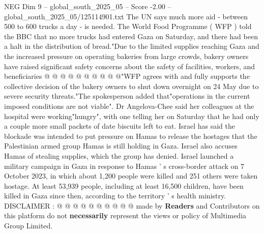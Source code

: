 \begin{textsample}{NEG Dim 9 – global\_south\_2025\_05 – Score -2.00 – global\_south\_2025\_05/125114901.txt}
The UN says much more aid - between 500 to 600 trucks a day - is needed.
The World Food Programme ( WFP ) told the BBC that no more trucks had entered Gaza on Saturday, and there had been a halt in the distribution of bread."Due to the limited supplies reaching Gaza and the increased pressure on operating bakeries from large crowds, bakery owners have raised significant safety concerns about the safety of facilities, workers, and beneficiaries @ @ @ @ @ @ @ @ @ @"WFP agrees with and fully supports the collective decision of the bakery owners to shut down overnight on 24 May due to severe security threats."The spokesperson added that"operations in the current imposed conditions are not viable".
Dr Angelova-Chee said her colleagues at the hospital were working"hungry", with one telling her on Saturday that he had only a couple more small packets of date biscuits left to eat.
Israel has said the blockade was intended to put pressure on Hamas to release the hostages that the Palestinian armed group Hamas is still holding in Gaza.
Israel also accuses Hamas of stealing supplies, which the group has denied.
Israel launched a military campaign in Gaza in response to Hamas ' s cross-border attack on 7 October 2023, in which about 1,200 people were killed and 251 others were taken hostage.
At least 53,939 people, including at least 16,500 children, have been killed in Gaza since then, according to the territory ' s health ministry.
DISCLAIMER : @ @ @ @ @ @ @ @ @ @ made by \textbf{Readers} and Contributors on this platform do not \textbf{necessarily} represent the views or policy of Multimedia Group Limited.

\end{textsample}
